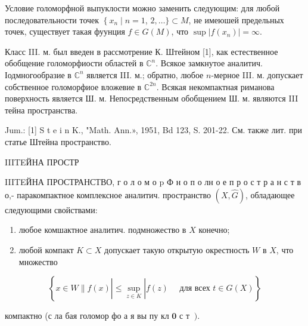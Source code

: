 \documentclass[10pt]{article}
\begin{document}
Условие голоморфной выпуклости можно заменить следующим: для любой последовательности точек $\left\{x_{n} \mid n=1\right.$, $2, \ldots\} \subset M$, не имеюшей предельных точек, существует такая фуунция $f \in G(M)$, что $\sup \left|f\left(x_{n}\right)\right|=\infty$.



Класс III. м. был введен в рассмотрение К. Штейном [1], как естественное обобщение голоморфиости областей в $\mathbb{C}^{n}$. Всякое замкнутое аналитич. Іодмногообразие в $\mathbb{C}^{n}$ является III. м.; обратно, любое $n$-мерное III. м. допускает собственное голоморфиое вложевие в $\mathbb{C}^{2 n}$. Всякая некомпактная риманова поверхность является Ш. м. Непосредственным обобщением Ш. м. являются III тейна пространства.



Jum.: [1] S t e i n K., "Math. Ann.», 1951, Bd 123, S. 201-22. См. также лит. при статье Штейна пространство.



IIITEЙНА ПРОСТР



IIITEЙНА ПРОСТРАНСТВО, г о л о м о $\mathrm{p}$ Ф н о п $о$ лн о е п р о с т р а н с т в о,- паракомпактное комплексное аналитич. пространство $(X, \widehat{G})$, обладающее следующими свойствами:



\begin{enumerate}

  \item любое комшактное аналитич. подмножество в $X$ конечно;



  \item любой компакт $K \subset X$ допускает такую открытую окрестность $W$ в $X$, что множество



\end{enumerate}



\[

\left\{x \in W \| f(x)\left|\leqslant \sup _{z \in K}\right| f(z) \quad \text { для всех } t \in G(X)\right\}

\]



компактно (с ла бая голомор фо а я вы пу кл $\mathbf{0}$ с т $\mathbf{~} \mathbf{)}$.
\end{document}
